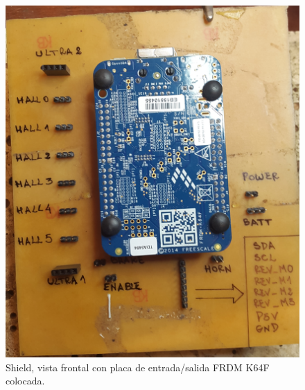 \documentclass[withindex,glossary]{cam-thesis}
\begin{document}
\begin{figure}[H]
  \centering
  \begin{minipage}[t]{0.4\textwidth}
    \includegraphics[width=\textwidth]{images/Shield_K64F}
    \caption[Shield, vista frontal]{Shield, vista frontal con placa de entrada/salida FRDM K64F colocada.}
    \label{fig:ShieldFront}
  \end{minipage}
  \hfill
  \begin{minipage}[t]{0.4\textwidth}

\end{minipage}
\end{figure}
\end{document}

